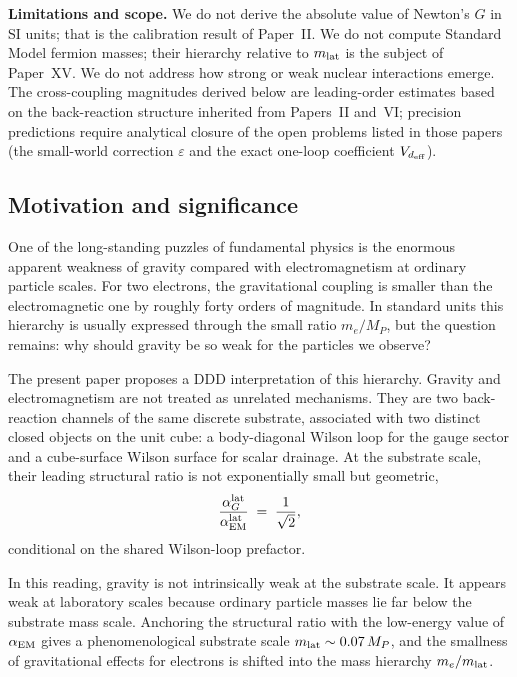 \documentclass[11pt,a4paper]{article}
\begin{document}
\textbf{Limitations and scope.}
We do not derive the absolute value of Newton's $G$ in SI
units; that is the calibration result of Paper~II.
We do not compute Standard Model fermion masses; their hierarchy
relative to $m_{\rm lat}$ is the subject of Paper~XV.
We do not address how strong or weak nuclear interactions emerge.
The cross-coupling magnitudes derived below are leading-order
estimates based on the back-reaction structure inherited from
Papers~II and~VI; precision predictions require analytical
closure of the open problems listed in those papers (the
small-world correction $\varepsilon$ and the exact one-loop
coefficient $V_{d_{\rm eff}}$).

\subsection*{Motivation and significance}

One of the long-standing puzzles of fundamental physics is the
enormous apparent weakness of gravity compared with
electromagnetism at ordinary particle scales. For two electrons,
the gravitational coupling is smaller than the electromagnetic
one by roughly forty orders of magnitude. In standard units this
hierarchy is usually expressed through the small ratio
$m_e/M_P$, but the question remains: why should gravity be so
weak for the particles we observe?

The present paper proposes a DDD interpretation of this
hierarchy. Gravity and electromagnetism are not treated as
unrelated mechanisms. They are two back-reaction channels of the
same discrete substrate, associated with two distinct closed
objects on the unit cube: a body-diagonal Wilson loop for the
gauge sector and a cube-surface Wilson surface for scalar
drainage. At the substrate scale, their leading structural ratio
is not exponentially small but geometric,
\begin{equation*}
\frac{\alpha_G^{\rm lat}}{\alpha_{\rm EM}^{\rm lat}}
\;=\; \frac{1}{\sqrt{2}},
\end{equation*}
conditional on the shared Wilson-loop prefactor.

In this reading, gravity is not intrinsically weak at the
substrate scale. It appears weak at laboratory scales because
ordinary particle masses lie far below the substrate mass scale.
Anchoring the structural ratio with the low-energy value of
$\alpha_{\rm EM}$ gives a phenomenological substrate scale
$m_{\rm lat}\sim 0.07\,M_P$, and the smallness of gravitational
effects for electrons is shifted into the mass hierarchy
$m_e/m_{\rm lat}$.
\end{document}
